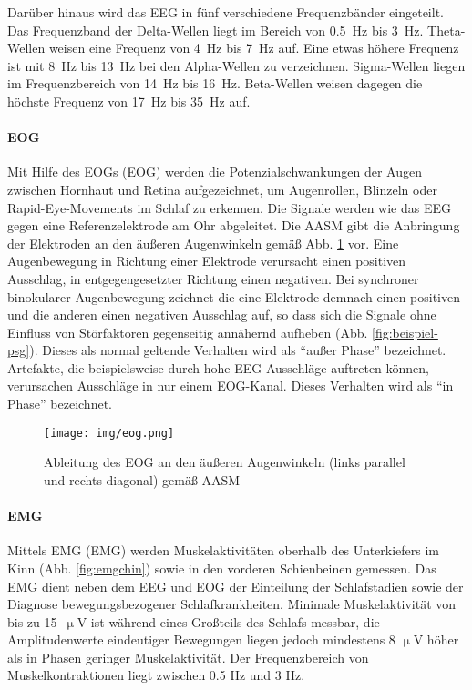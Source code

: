 Darüber hinaus wird das \acs{EEG} in fünf verschiedene Frequenzbänder eingeteilt. Das Frequenzband der Delta-Wellen liegt im Bereich von 0.5~Hz bis 3~Hz. Theta-Wellen weisen eine Frequenz von 4~Hz bis 7~Hz auf. Eine etwas höhere Frequenz ist mit 8~Hz bis 13~Hz bei den Alpha-Wellen zu verzeichnen. Sigma-Wellen liegen im Frequenzbereich von 14~Hz bis 16~Hz. Beta-Wellen weisen dagegen die höchste Frequenz von 17~Hz bis 35~Hz auf. \parencite{lee-chiong_sleep_2008, steinberg_schlafmedizin_2010}\\

\paragraph{\acs{EOG}}
Mit Hilfe des \acl{EOG}s (\acs{EOG}) werden die Potenzialschwankungen der Augen zwischen Hornhaut und Retina aufgezeichnet, um Augenrollen, Blinzeln oder Rapid-Eye-Movements im Schlaf zu erkennen. Die Signale werden wie das \acs{EEG} gegen eine Referenzelektrode am Ohr abgeleitet. Die \acs{AASM} gibt die Anbringung der Elektroden an den äußeren Augenwinkeln gemäß Abb. \ref{fig:eog} vor. Eine Augenbewegung in Richtung einer Elektrode verursacht einen positiven Ausschlag, in entgegengesetzter Richtung einen negativen. Bei synchroner binokularer Augenbewegung zeichnet die eine Elektrode demnach einen positiven und die anderen einen negativen Ausschlag auf, so dass sich die Signale ohne Einfluss von Störfaktoren gegenseitig annähernd aufheben (Abb. \ref{fig:beispiel-psg}). Dieses als normal geltende Verhalten wird als "`außer Phase"' bezeichnet. Artefakte, die beispielsweise durch hohe \acs{EEG}-Ausschläge auftreten können, verursachen Ausschläge in nur einem \acs{EOG}-Kanal. Dieses Verhalten wird als "`in Phase"' bezeichnet. \parencite{iber_aasm_2007, lee-chiong_sleep_2008}

\begin{figure}[H]
	\centering
	\texttt{[image: img/eog.png]}
	\caption[Elektrodenpositionen des \acs{EOG}]{Ableitung des \acs{EOG} an den äußeren Augenwinkeln (links parallel und rechts diagonal) gemäß \acs{AASM} \parencite{iber_aasm_2007}}
	\label{fig:eog}
\end{figure}

\paragraph{\acs{EMG}}
Mittels \acl{EMG} (\acs{EMG}) werden Muskelaktivitäten oberhalb des Unterkiefers im Kinn (Abb. \ref{fig:emgchin}) sowie in den vorderen Schienbeinen gemessen. Das \acs{EMG} dient neben dem \acs{EEG} und \acs{EOG} der Einteilung der Schlafstadien sowie der Diagnose bewegungsbezogener Schlafkrankheiten. Minimale Muskelaktivität von bis zu 15~$\upmu$V ist während eines Großteils des Schlafs messbar, die Amplitudenwerte eindeutiger Bewegungen liegen jedoch mindestens 8 $\upmu$V höher als in Phasen geringer Muskelaktivität. Der Frequenzbereich von Muskelkontraktionen liegt zwischen 0.5 Hz und 3 Hz. \parencite{iber_aasm_2007, leroux_handbuch_2009, lee-chiong_sleep_2008}

